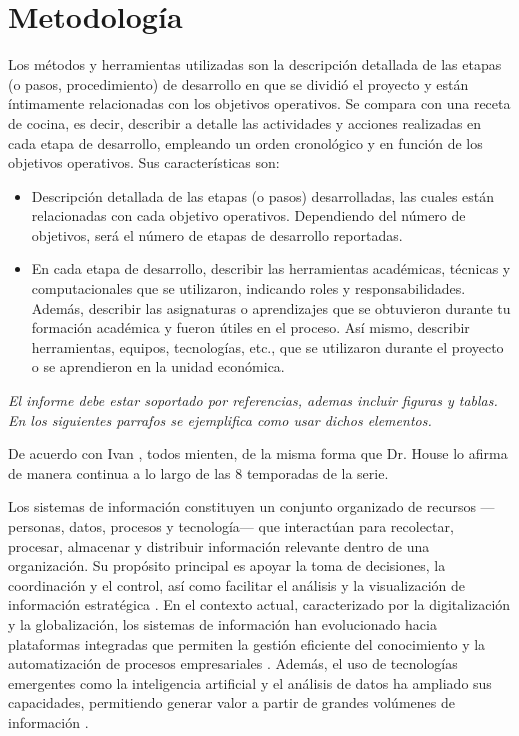 \section{Metodología}

Los métodos y herramientas utilizadas son la descripción detallada de las etapas
(o pasos, procedimiento) de desarrollo en que se dividió el proyecto y están
íntimamente relacionadas con los objetivos operativos. Se compara con una
receta de cocina, es decir, describir a detalle las actividades y acciones realizadas
en cada etapa de desarrollo, empleando un orden cronológico y en función de los
objetivos operativos. Sus características son:
\begin{itemize}
\item Descripción detallada de las etapas (o pasos) desarrolladas, las cuales están
relacionadas con cada objetivo operativos. Dependiendo del número de
objetivos, será el número de etapas de desarrollo reportadas.
\item En cada etapa de desarrollo, describir las herramientas académicas, técnicas
y computacionales que se utilizaron, indicando roles y responsabilidades.
Además, describir las asignaturas o aprendizajes que se obtuvieron durante tu
formación académica y fueron útiles en el proceso. Así mismo, describir
herramientas, equipos, tecnologías, etc., que se utilizaron durante el proyecto o
se aprendieron en la unidad económica.
\end{itemize}

\textit{El informe debe estar soportado por referencias, ademas incluir figuras y tablas. En los siguientes parrafos se ejemplifica como usar dichos elementos. }

De acuerdo con Ivan \cite{Sistema:2018:Ivan}, todos mienten, de la misma forma que Dr. House lo afirma de manera continua a lo largo de las 8 temporadas de la serie. 

Los sistemas de información constituyen un conjunto organizado de recursos —personas, datos, procesos y tecnología— que interactúan para recolectar, procesar, almacenar y distribuir información relevante dentro de una organización. Su propósito principal es apoyar la toma de decisiones, la coordinación y el control, así como facilitar el análisis y la visualización de información estratégica \cite{laudon2020, stair2018}. En el contexto actual, caracterizado por la digitalización y la globalización, los sistemas de información han evolucionado hacia plataformas integradas que permiten la gestión eficiente del conocimiento y la automatización de procesos empresariales \cite{turban2019}. Además, el uso de tecnologías emergentes como la inteligencia artificial y el análisis de datos ha ampliado sus capacidades, permitiendo generar valor a partir de grandes volúmenes de información \cite{davenport2018}.

